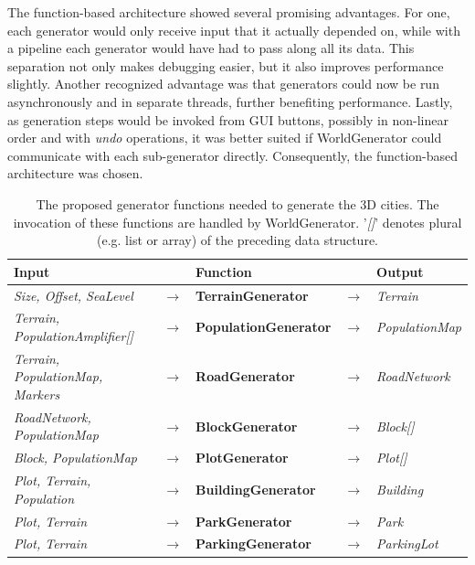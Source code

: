 The function-based architecture showed several promising advantages.
For one, each generator would only receive input that it actually depended on, while with a pipeline each generator would have had to pass along all its data.
This separation not only makes debugging easier, but it also improves performance slightly.
Another recognized advantage was that generators could now be run asynchronously and in separate threads, further benefiting performance.
Lastly, as generation steps would be invoked from GUI buttons, possibly in non-linear order and with \textit{undo} operations, it was better suited if WorldGenerator could communicate with each sub-generator directly.
Consequently, the function-based architecture was chosen.

\begin{table}[H]
  \centering
  \begin{tabular}{lllll}
    \textbf{Input}                           &               & \textbf{Function}            &               & \textbf{Output}         \\
    \midrule
    \textit{Size, Offset, SeaLevel}          & $\rightarrow$ & \textbf{TerrainGenerator}    & $\rightarrow$ & \textit{Terrain}        \\
    \textit{Terrain, PopulationAmplifier[]}  & $\rightarrow$ & \textbf{PopulationGenerator} & $\rightarrow$ & \textit{PopulationMap}  \\
    \textit{Terrain, PopulationMap, Markers}          & $\rightarrow$ & \textbf{RoadGenerator}       & $\rightarrow$ & \textit{RoadNetwork}    \\
    \textit{RoadNetwork, PopulationMap}      & $\rightarrow$ & \textbf{BlockGenerator}      & $\rightarrow$ & \textit{Block[]}        \\
    \textit{Block, PopulationMap}            & $\rightarrow$ & \textbf{PlotGenerator}       & $\rightarrow$ & \textit{Plot[]}         \\
    \textit{Plot, Terrain, Population}       & $\rightarrow$ & \textbf{BuildingGenerator}   & $\rightarrow$ & \textit{Building}       \\
    \textit{Plot, Terrain}                   & $\rightarrow$ & \textbf{ParkGenerator}       & $\rightarrow$ & \textit{Park}           \\
    \textit{Plot, Terrain}                   & $\rightarrow$ & \textbf{ParkingGenerator}    & $\rightarrow$ & \textit{ParkingLot}     \\
    \bottomrule
  \end{tabular}

  \caption[]{The proposed generator functions needed to generate the 3D cities. The invocation of these functions are handled by WorldGenerator. '\textit{[]}' denotes plural (e.g. list or array) of the preceding data structure.}
  \label{table:generators}
\end{table}
\vspace{-0.4cm} %

